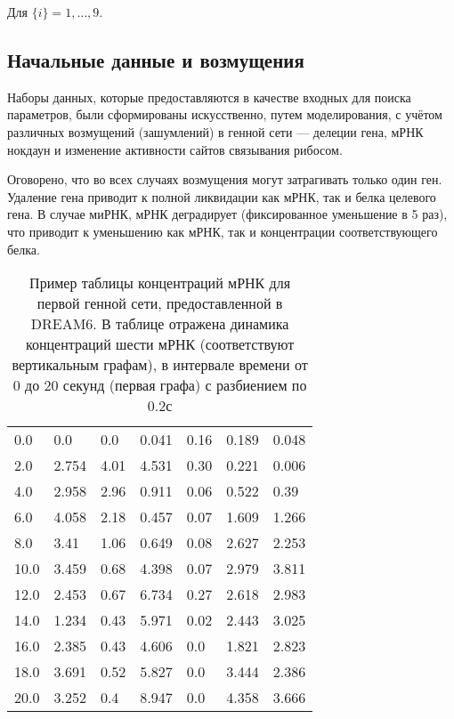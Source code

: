 Для $\{i\} = 1, \dots, 9$.

\subsection{Начальные данные и возмущения} \label{s2_4}

Наборы данных, которые предоставляются в качестве входных для поиска параметров,
были сформированы искусственно, путем моделирования, с учётом различных 
возмущений (зашумлений) в генной сети — делеции гена, мРНК нокдаун и изменение 
активности сайтов связывания рибосом. 

Оговорено, что во всех случаях возмущения могут затрагивать только один ген. 
Удаление гена приводит к полной ликвидации как мРНК, так и белка целевого гена. 
В случае миРНК, мРНК деградирует (фиксированное уменьшение в 5 раз), что 
приводит к уменьшению как мРНК, так и концентрации соответствующего белка.

\begin{table}[h]
  \centering
    \begin{tabular}{l|llllll}
        0.0	  & 0.0    & 0.0   & 0.041  & 0.16  & 0.189  & 0.048 \\
        2.0	  & 2.754  & 4.01  & 4.531  & 0.30  & 0.221  & 0.006 \\
        4.0	  & 2.958  & 2.96  & 0.911  & 0.06  & 0.522  & 0.39  \\
        6.0	  & 4.058  & 2.18  & 0.457  & 0.07  & 1.609  & 1.266 \\
        8.0	  & 3.41   & 1.06  & 0.649  & 0.08  & 2.627  & 2.253 \\
        10.0  & 3.459  & 0.68  & 4.398  & 0.07  & 2.979  & 3.811 \\
        12.0  & 2.453  & 0.67  & 6.734  & 0.27  & 2.618  & 2.983 \\
        14.0  & 1.234  & 0.43  & 5.971  & 0.02  & 2.443  & 3.025 \\
        16.0  & 2.385  & 0.43  & 4.606  & 0.0   & 1.821  & 2.823 \\
        18.0  & 3.691  & 0.52  & 5.827  & 0.0   & 3.444  & 2.386 \\
        20.0  & 3.252  & 0.4   & 8.947  & 0.0   & 4.358  & 3.666 
    \end{tabular}
  \caption{Пример таблицы концентраций мРНК для первой генной сети, 
  предоставленной в DREAM6. В таблице отражена динамика концентраций шести мРНК
  (соответствуют вертикальным графам), в интервале времени от 0 до 20 секунд 
  (первая графа) с разбиением по 0.2с}
  \label{mRNAtable}
\end{table}

